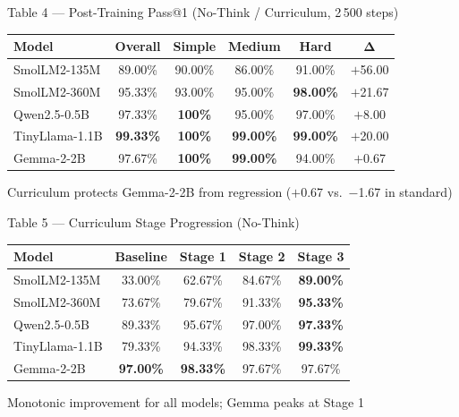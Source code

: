 \documentclass[10pt, aspectratio=169]{beamer}
\begin{document}
\begin{frame}{Table 4 — Post-Training Pass@1 (No-Think / Curriculum, 2\,500 steps)}
  \centering
  \footnotesize
  \renewcommand{\arraystretch}{1.55}
  \setlength\tabcolsep{7pt}
  \begin{tabular}{@{}lccccc@{}}
    \toprule
    \textbf{Model} & \textbf{Overall} & \textbf{Simple} & \textbf{Medium} & \textbf{Hard} & $\boldsymbol{\Delta}$ \\
    \midrule
    SmolLM2-135M   & 89.00\% & 90.00\% & 86.00\% & 91.00\% & \alert{$+$56.00} \\
    SmolLM2-360M   & 95.33\% & 93.00\% & 95.00\% & \textbf{98.00\%} & $+$21.67 \\
    Qwen2.5-0.5B   & 97.33\% & \textbf{100\%} & 95.00\% & 97.00\% & $+$8.00  \\
    TinyLlama-1.1B & \textbf{99.33\%} & \textbf{100\%} & \textbf{99.00\%} & \textbf{99.00\%} & $+$20.00 \\
    Gemma-2-2B     & 97.67\% & \textbf{100\%} & \textbf{99.00\%} & 94.00\% & $+$0.67  \\
    \bottomrule
  \end{tabular}
  \vspace{0.5em}

  \small Curriculum protects Gemma-2-2B from regression ($+$0.67 vs.\ $-$1.67 in standard)
\end{frame}

\begin{frame}{Table 5 — Curriculum Stage Progression (No-Think)}
  \centering
  \footnotesize
  \renewcommand{\arraystretch}{1.55}
  \setlength\tabcolsep{9pt}
  \begin{tabular}{@{}lcccc@{}}
    \toprule
    \textbf{Model} & \textbf{Baseline} & \textbf{Stage 1} & \textbf{Stage 2} & \textbf{Stage 3} \\
    \midrule
    SmolLM2-135M   & 33.00\% & 62.67\% & 84.67\% & \textbf{89.00\%} \\
    SmolLM2-360M   & 73.67\% & 79.67\% & 91.33\% & \textbf{95.33\%} \\
    Qwen2.5-0.5B   & 89.33\% & 95.67\% & 97.00\% & \textbf{97.33\%} \\
    TinyLlama-1.1B & 79.33\% & 94.33\% & 98.33\% & \textbf{99.33\%} \\
    Gemma-2-2B     & \textbf{97.00\%} & \textbf{98.33\%} & 97.67\% & 97.67\% \\
    \bottomrule
  \end{tabular}
  \vspace{0.5em}

  \small Monotonic improvement for all models; Gemma peaks at Stage 1
\end{frame}
\end{document}
